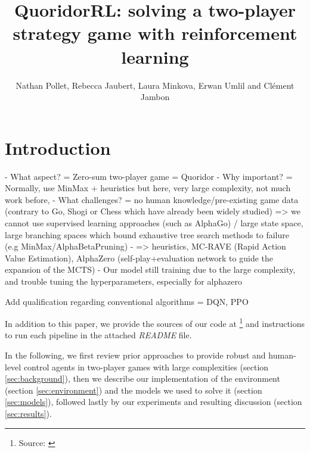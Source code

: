 \documentclass[journal, a4paper]{IEEEtran}
\newif\ifanonymous
\begin{document}
\title{QuoridorRL: solving a two-player strategy game with reinforcement learning}
\ifanonymous
\author{Anonymous Authors}
\else
\author{Nathan Pollet, Rebecca Jaubert, Laura Minkova, Erwan Umlil and Clément Jambon}
\fi
\maketitle

\begin{abstract}

\end{abstract}

\section{Introduction}
\label{sec:intro}

- What aspect? = Zero-sum two-player game = Quoridor
- Why important? = Normally, use MinMax + heuristics but here, very large complexity, not much work before, 
- What challenges? = no human knowledge/pre-existing game data (contrary to Go, Shogi or Chess which have already been widely studied) => we cannot use supervised learning approaches (such as AlphaGo\cite{alphago}) / large state space, large branching spaces which bound exhaustive tree search methods to failure (e.g MinMax/AlphaBetaPruning)
- => heuristics, MC-RAVE (Rapid Action Value Estimation), AlphaZero (self-play+evaluation network to guide the expansion of the MCTS)
- Our model still training due to the large complexity, and trouble tuning the hyperparameters, especially for alphazero

Add qualification regarding conventional algorithms = DQN, PPO


In addition to this paper, we provide the sources of our code at \footnote{Source: \url{}} and instructions to run each pipeline in the attached \textit{README} file. 

In the following, we first review prior approaches to provide robust and human-level control agents in two-player games with large complexities (section \ref{sec:background}), then we describe our implementation of the environment (section \ref{sec:environment}) and the models we used to solve it (section \ref{sec:models}), followed lastly by our experiments and resulting discussion (section \ref{sec:results}).
\end{document}

